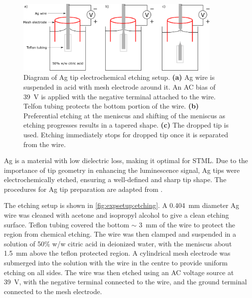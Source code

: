 \begin{figure} [h]
    \centering
    
    \includegraphics[width=0.9\textwidth]{pictures/etch_diagram.png}
    
    \caption{Diagram of Ag tip electrochemical etching setup. \textbf{(a)} Ag wire is suspended in acid with mesh electrode around it. An AC bias of \SI{39}{V} is applied with the negative terminal attached to the wire. Telfon tubing protects the bottom portion of the wire. \textbf{(b)} Preferential etching at the meniscus and shifting of the meniscus as etching progresses results in a tapered shape. \textbf{(c)} The dropped tip is used. Etching immediately stops for dropped tip once it is separated from the wire. }
    \label{fig:expsetup:etching}
\end{figure}

Ag is a material with low dielectric loss, making it optimal for \ac{STML}. Due to the importance of tip geometry in enhancing the luminescence signal, Ag tips were electrochemically etched, ensuring a well-defined and sharp tip shape. The procedures for Ag tip preparation are adapted from \citep{roussy2016coupling, zhang2011fabrication}. 

The etching setup is shown in \autoref{fig:expsetup:etching}. A \SI{0.404}{mm} diameter Ag wire was cleaned with acetone and isopropyl alcohol to give a clean etching surface. Teflon tubing covered the bottom $\sim$ \SI{3}{mm} of the wire to protect the region from chemical etching. The wire was then clamped and suspended in a solution of 50\% w/w citric acid in deionized water, with the meniscus about \SI{1.5}{mm} above the teflon protected region. A cylindrical mesh electrode was submerged into the solution with the wire in the centre to provide uniform etching on all sides. The wire was then etched using an \ac{AC} voltage source at \SI{39}{V}, with the negative terminal connected to the wire, and the ground terminal connected to the mesh electrode. 


